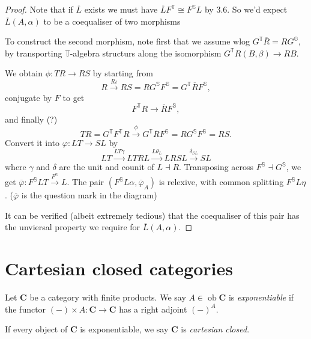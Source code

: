 \documentclass[a4paper]{article}
\renewcommand{\c}[1]{\mathbf{#1}}
\DeclareMathOperator{\ob}{ob}
\newcommand{\adjoint}{\dashv}
\newcommand{\T}{{\mathbb{T}}} %
\begin{document}
\begin{proof}
  Note that if \(\overline L\) exists we must have \(\overline L F^\T \cong F^{\mathbb S} L\) by 3.6. So we'd expect \(\overline L(A, \alpha)\) to be a coequaliser of two morphisms
  To construct the second morphism, note first that we assume wlog \(G^\T \overline R = RG^{\mathbb G}\), by transporting \(\T\)-algebra structurs along the isomorphism \(G^\T R(B, \beta) \to RB\).

  We obtain \(\phi: TR \to RS\) by starting from
  \[
    R \xrightarrow{R\iota} RS = RG^{\mathbb S} F^{\mathbb S} = G^\T \overline R F^{\mathbb S},
  \]
  conjugate by \(F\) to get
  \[
    F^\T R \to \overline R F^{\mathbb S},
  \]
  and finally (?)
  \[
    TR = G^\T F^\T R \xrightarrow{\phi} G^\T \overline R F^{\mathbb S} = RG^{\mathbb S} F^{\mathbb S} = RS.
  \]
  Convert it into \(\varphi: LT \to SL\) by
  \[
    LT \xrightarrow{LT\gamma} LTRL \xrightarrow{L\theta_L} LRSL \xrightarrow{\delta_{SL}} SL
  \]
  where \(\gamma\) and \(\delta\) are the unit and counit of \(L \adjoint R\). Transposing across \(F^{\mathbb S} \adjoint G^{\mathbb S}\), we get \(\overline \varphi: F^{\mathbb S} LT \xrightarrow{F^{\mathbb S}} L\). The pair \((F^{\mathbb S} L\alpha, \overline \varphi_A)\) is relexive, with common splitting \(F^{\mathbb S}L\eta\). (\(\overline \varphi\) is the question mark in the diagram)

  It can be verified (albeit extremely tedious) that the coequaliser of this pair has the unviersal property we require for \(\overline L(A, \alpha)\).
\end{proof}

\section{Cartesian closed categories}

\begin{definition}
  Let \(\c C\) be a category with finite products. We say \(A \in \ob \c C\) is \emph{exponentiable} if the functor \((-) \times A: \c C \to \c C\) has a right adjoint \((-)^A\).

  If every object of \(\c C\) is exponentiable, we say \(\c C\) is \emph{cartesian closed}.
\end{definition}
\end{document}
